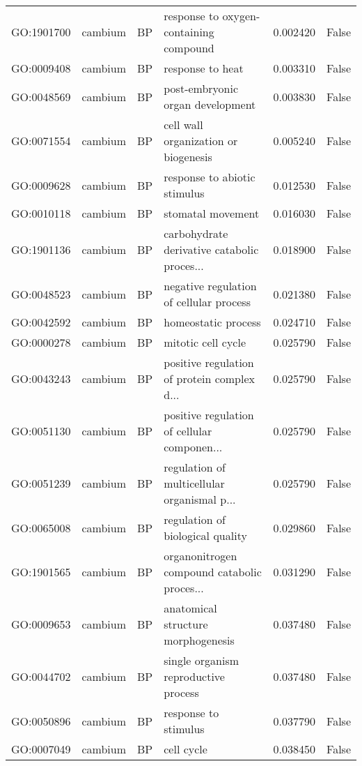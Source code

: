 \begin{longtable}{llllrl}
GO:1901700 & cambium & BP &        response to oxygen-containing compound  & 0.002420 &   False \\
GO:0009408 & cambium & BP &                              response to heat  & 0.003310 &   False \\
GO:0048569 & cambium & BP &              post-embryonic organ development  & 0.003830 &   False \\
GO:0071554 & cambium & BP &          cell wall organization or biogenesis  & 0.005240 &   False \\
GO:0009628 & cambium & BP &                  response to abiotic stimulus  & 0.012530 &   False \\
GO:0010118 & cambium & BP &                             stomatal movement  & 0.016030 &   False \\
GO:1901136 & cambium & BP &   carbohydrate derivative catabolic proces...  & 0.018900 &   False \\
GO:0048523 & cambium & BP &       negative regulation of cellular process  & 0.021380 &   False \\
GO:0042592 & cambium & BP &                           homeostatic process  & 0.024710 &   False \\
GO:0000278 & cambium & BP &                            mitotic cell cycle  & 0.025790 &   False \\
GO:0043243 & cambium & BP &   positive regulation of protein complex d...  & 0.025790 &   False \\
GO:0051130 & cambium & BP &   positive regulation of cellular componen...  & 0.025790 &   False \\
GO:0051239 & cambium & BP &   regulation of multicellular organismal p...  & 0.025790 &   False \\
GO:0065008 & cambium & BP &              regulation of biological quality  & 0.029860 &   False \\
GO:1901565 & cambium & BP &   organonitrogen compound catabolic proces...  & 0.031290 &   False \\
GO:0009653 & cambium & BP &            anatomical structure morphogenesis  & 0.037480 &   False \\
GO:0044702 & cambium & BP &          single organism reproductive process  & 0.037480 &   False \\
GO:0050896 & cambium & BP &                          response to stimulus  & 0.037790 &   False \\
GO:0007049 & cambium & BP &                                    cell cycle  & 0.038450 &   False \\

\end{longtable}
